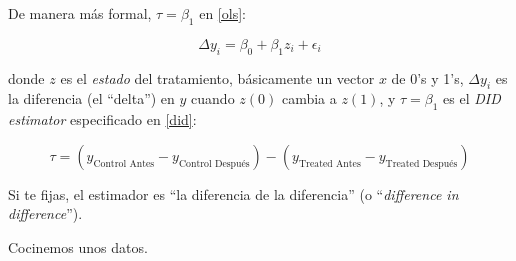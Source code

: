 \documentclass[onesided]{article}\usepackage[]{graphicx}\usepackage[]{color}
\begin{document}
De manera m\'as formal, $\tau=\beta_{1}$ en \autoref{ols}:

\begin{equation}\label{ols}
\Delta y_{i} = \beta_{0} + \beta_{1}z_{i} + \epsilon_{i}
\end{equation}

donde $z$ es el \emph{estado} del tratamiento, b\'asicamente un vector $x$ de 0's y 1's, $\Delta y_{i}$ es la diferencia (el ``delta'') en $y$ cuando $z(0)$ cambia a $z(1)$, y $\tau=\beta_{1}$ es el \emph{DID estimator} especificado en \autoref{did}:


\begin{equation}\label{did}
\tau = (y_{\text{Control Antes}}-y_{\text{Control Despu\'es}}) - (y_{\text{Treated Antes}}-y_{\text{Treated Despu\'es}})
\end{equation}

Si te fijas, el estimador es ``la diferencia de la diferencia'' (o ``\emph{difference in difference}'').


Cocinemos unos datos.
\end{document}
